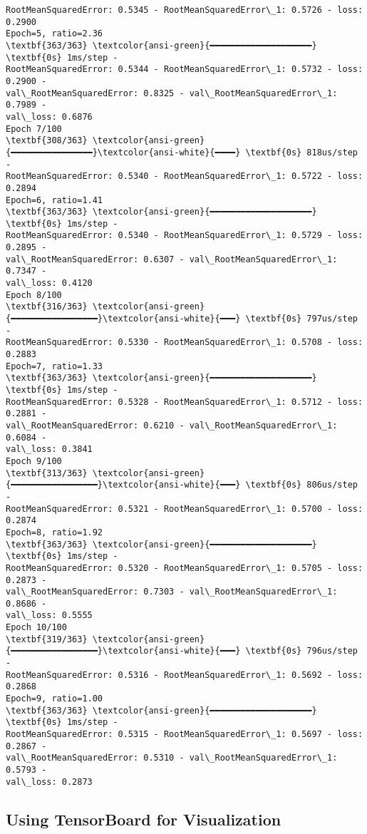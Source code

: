 \documentclass[12pt letter]{report}
\begin{document}
\begin{Verbatim}[commandchars=\\\{\}]
RootMeanSquaredError: 0.5345 - RootMeanSquaredError\_1: 0.5726 - loss: 0.2900
Epoch=5, ratio=2.36
\textbf{363/363} \textcolor{ansi-green}{━━━━━━━━━━━━━━━━━━━━} \textbf{0s} 1ms/step -
RootMeanSquaredError: 0.5344 - RootMeanSquaredError\_1: 0.5732 - loss: 0.2900 -
val\_RootMeanSquaredError: 0.8325 - val\_RootMeanSquaredError\_1: 0.7989 -
val\_loss: 0.6876
Epoch 7/100
\textbf{308/363} \textcolor{ansi-green}{━━━━━━━━━━━━━━━━}\textcolor{ansi-white}{━━━━} \textbf{0s} 818us/step -
RootMeanSquaredError: 0.5340 - RootMeanSquaredError\_1: 0.5722 - loss: 0.2894
Epoch=6, ratio=1.41
\textbf{363/363} \textcolor{ansi-green}{━━━━━━━━━━━━━━━━━━━━} \textbf{0s} 1ms/step -
RootMeanSquaredError: 0.5340 - RootMeanSquaredError\_1: 0.5729 - loss: 0.2895 -
val\_RootMeanSquaredError: 0.6307 - val\_RootMeanSquaredError\_1: 0.7347 -
val\_loss: 0.4120
Epoch 8/100
\textbf{316/363} \textcolor{ansi-green}{━━━━━━━━━━━━━━━━━}\textcolor{ansi-white}{━━━} \textbf{0s} 797us/step -
RootMeanSquaredError: 0.5330 - RootMeanSquaredError\_1: 0.5708 - loss: 0.2883
Epoch=7, ratio=1.33
\textbf{363/363} \textcolor{ansi-green}{━━━━━━━━━━━━━━━━━━━━} \textbf{0s} 1ms/step -
RootMeanSquaredError: 0.5328 - RootMeanSquaredError\_1: 0.5712 - loss: 0.2881 -
val\_RootMeanSquaredError: 0.6210 - val\_RootMeanSquaredError\_1: 0.6084 -
val\_loss: 0.3841
Epoch 9/100
\textbf{313/363} \textcolor{ansi-green}{━━━━━━━━━━━━━━━━━}\textcolor{ansi-white}{━━━} \textbf{0s} 806us/step -
RootMeanSquaredError: 0.5321 - RootMeanSquaredError\_1: 0.5700 - loss: 0.2874
Epoch=8, ratio=1.92
\textbf{363/363} \textcolor{ansi-green}{━━━━━━━━━━━━━━━━━━━━} \textbf{0s} 1ms/step -
RootMeanSquaredError: 0.5320 - RootMeanSquaredError\_1: 0.5705 - loss: 0.2873 -
val\_RootMeanSquaredError: 0.7303 - val\_RootMeanSquaredError\_1: 0.8686 -
val\_loss: 0.5555
Epoch 10/100
\textbf{319/363} \textcolor{ansi-green}{━━━━━━━━━━━━━━━━━}\textcolor{ansi-white}{━━━} \textbf{0s} 796us/step -
RootMeanSquaredError: 0.5316 - RootMeanSquaredError\_1: 0.5692 - loss: 0.2868
Epoch=9, ratio=1.00
\textbf{363/363} \textcolor{ansi-green}{━━━━━━━━━━━━━━━━━━━━} \textbf{0s} 1ms/step -
RootMeanSquaredError: 0.5315 - RootMeanSquaredError\_1: 0.5697 - loss: 0.2867 -
val\_RootMeanSquaredError: 0.5310 - val\_RootMeanSquaredError\_1: 0.5793 -
val\_loss: 0.2873
    \end{Verbatim}

\subsection{Using TensorBoard for
Visualization}\label{using-tensorboard-for-visualization}
\end{document}
